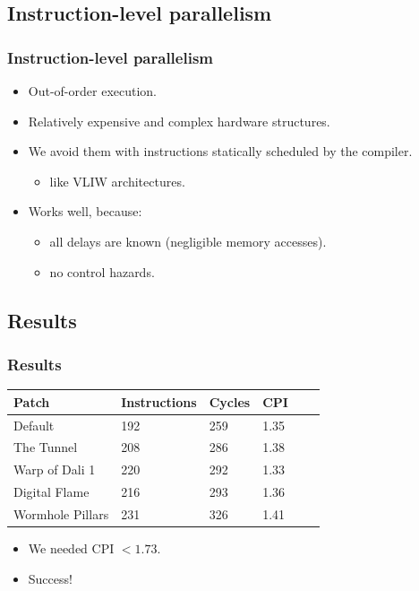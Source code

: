 \documentclass{beamer}
\begin{document}
\subsection{Instruction-level parallelism}
\frame
{
  \frametitle{Instruction-level parallelism}
  \begin{itemize}
  \item Out-of-order execution.
  \item Relatively expensive and complex hardware structures.
  \item We avoid them with instructions statically scheduled by the compiler.
  \begin{itemize}
  \item like VLIW architectures.
  \end{itemize}
  \item Works well, because:
  \begin{itemize}
  \item all delays are known (negligible memory accesses).
  \item no control hazards.
  \end{itemize}
  \end{itemize}
}

\subsection{Results}
\frame
{
  \frametitle{Results}

  \begin{tabular}{|l|l|l|l|l|l|}
  \hline
  \textbf{Patch} & \textbf{Instructions} & \textbf{Cycles} & \textbf{CPI} \\
  \hline
  Default & 192 & 259 & 1.35 \\
  \hline
  The Tunnel & 208 & 286 & 1.38 \\
  \hline
  Warp of Dali 1 & 220 & 292 & 1.33 \\
  \hline
  Digital Flame & 216 & 293 & 1.36 \\
  \hline
  Wormhole Pillars & 231 & 326 & 1.41 \\
  \hline
  \end{tabular}
  \begin{itemize}
  \item We needed CPI $< 1.73$.
  \item Success!
  \end{itemize}
}
\end{document}
